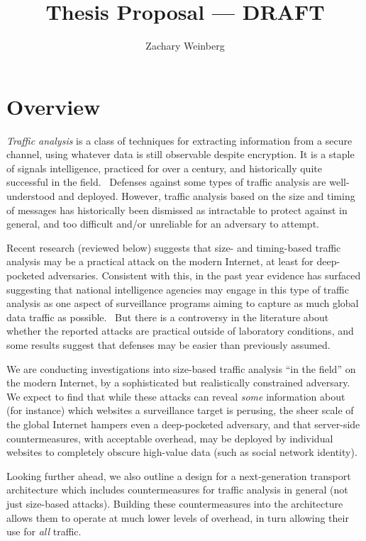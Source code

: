 \documentclass[oneside]{zarticle}
\begin{document}
\title{Thesis Proposal --- DRAFT}
\author{Zachary Weinberg}
\maketitle

\section{Overview}

\emph{Traffic analysis} is a class of techniques for extracting
information from a secure channel, using whatever data is still
observable despite encryption.  It is a staple of signals
intelligence, practiced for over a century, and historically quite
successful in the field.~\cite{kahn1967codebreakers} Defenses against
some types of traffic analysis are well-understood and deployed.
However, traffic analysis based on the size and timing of messages has
historically been dismissed as intractable to protect against in
general, and too difficult and/or unreliable for an adversary to
attempt.~\cite{ferguson2010ceng}

Recent research (reviewed below) suggests that size- and timing-based
traffic analysis may be a practical attack on the modern Internet, at
least for deep-pocketed adversaries.  Consistent with this, in the
past year evidence has surfaced suggesting that national intelligence
agencies may engage in this type of traffic analysis as one aspect of
surveillance programs aiming to capture as much global data traffic as
possible.~\cite{greenwald2013nsa} But there is a controversy in the
literature about whether the reported attacks are practical outside of
laboratory conditions, and some results suggest that defenses may be
easier than previously assumed.

We are conducting investigations into size-based traffic analysis “in
the field” on the modern Internet, by a sophisticated but
realistically constrained adversary.  We expect to find that while
these attacks can reveal \emph{some} information about (for instance)
which websites a surveillance target is perusing, the sheer scale of
the global Internet hampers even a deep-pocketed adversary, and that
server-side countermeasures, with acceptable overhead, may be deployed
by individual websites to completely obscure high-value data (such as
social network identity).

Looking further ahead, we also outline a design for a next-generation
transport architecture which includes countermeasures for traffic
analysis in general (not just size-based attacks).  Building these
countermeasures into the architecture allows them to operate at much
lower levels of overhead, in turn allowing their use for \emph{all}
traffic.
\end{document}
